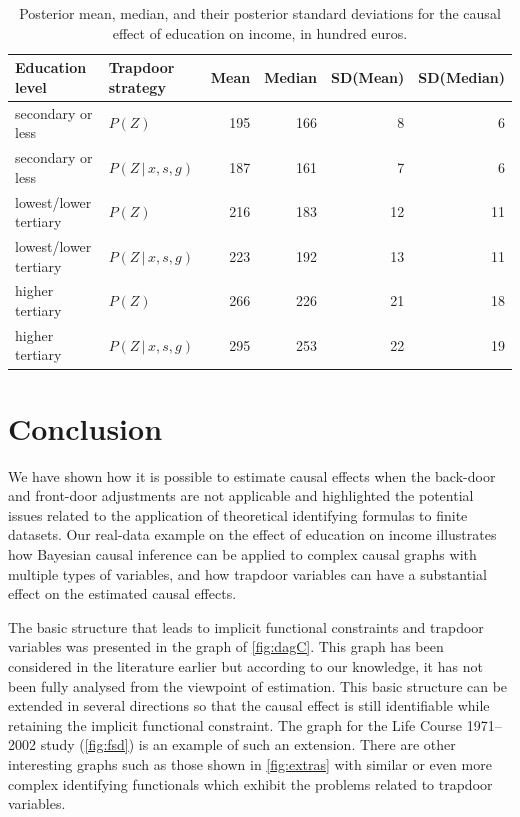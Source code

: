 \documentclass[11pt,a4paper,twoside]{article}
\newcommand{\+}[1]{\ensuremath{\mathbf{#1}}}
\newcommand{\given}{{ \, | \, }}
\begin{document}
\begin{table}[h]
	\caption{Posterior mean, median, and their posterior standard deviations for the causal effect of education on income, in hundred euros.}
	\label{table:fsd-posterior-summary}
	\centering
	\begin{tabular}{llrrrr}
		Education level & Trapdoor strategy & Mean & Median & SD(Mean) & SD(Median) \\
		\hline
		secondary or less      & $P(Z)$                 & 195 & 166 & 8  & 6  \\
		secondary or less      &  $P(Z \given x, s, g)$ & 187 & 161 & 7  & 6  \\
		lowest/lower tertiary  & $P(Z)$                 & 216 & 183 & 12 & 11 \\
		lowest/lower tertiary  &  $P(Z \given x, s, g)$ & 223 & 192 & 13 & 11 \\
		higher tertiary        & $P(Z)$                 & 266 & 226 & 21 & 18 \\
		higher tertiary        &  $P(Z \given x, s, g)$ & 295 & 253 & 22 & 19 \\
	\end{tabular}
\end{table}

	
	\section{Conclusion}
	\label{sec:discussion}
	
	We have shown how it is possible to estimate causal effects when the back-door and front-door adjustments are not applicable and highlighted the potential issues related to the application of theoretical identifying formulas to finite datasets. Our real-data example on the effect of education on income illustrates how Bayesian causal inference can be applied to complex causal graphs with multiple types of variables, and how trapdoor variables can have a substantial effect on the estimated causal effects. 
	
	The basic structure that leads to implicit functional constraints and trapdoor variables was presented in the graph of \autoref{fig:dagC}. This graph has been considered in the literature earlier but according to our knowledge, it has not been fully analysed from the viewpoint of estimation. This basic structure can be extended in several directions so that the causal effect is still identifiable while retaining the implicit functional constraint. The graph for the Life Course 1971--2002 study (\autoref{fig:fsd}) is an example of such an extension. There are other interesting graphs such as those shown in \autoref{fig:extras} with similar or even more complex identifying functionals which exhibit the problems related to trapdoor variables.
	
\end{document}

